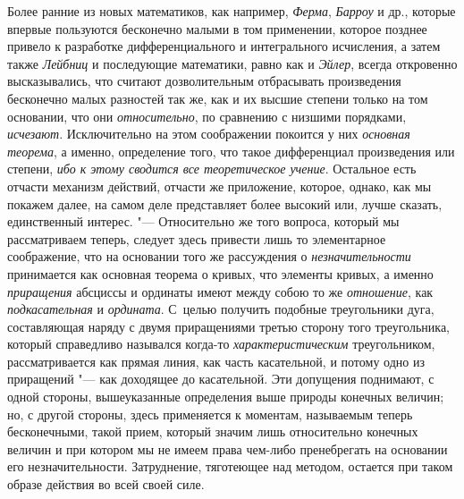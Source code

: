 Более ранние из новых математиков, как например, {\em Ферма}, {\em Барроу} и
др., которые впервые пользуются бесконечно малыми в том применении, которое
позднее привело к разработке дифференциального и интегрального исчисления, а
затем также {\em Лейбниц} и последующие математики, равно как и {\em Эйлер},
всегда откровенно высказывались, что считают дозволительным отбрасывать
произведения бесконечно малых разностей так же, как и их высшие степени только
на том основании, что они {\em относительно}, по сравнению с низшими порядками,
{\em исчезают}. Исключительно на этом соображении покоится у них
{\em основная теорема}, а именно, определение того, что такое дифференциал
произведения или степени, {\em ибо к этому сводится все теоретическое
учение}. Остальное есть отчасти механизм действий, отчасти же приложение,
которое, однако, как мы покажем далее, на самом деле представляет более высокий
или, лучше сказать, единственный интерес. "--- Относительно же того вопроса,
который мы рассматриваем теперь, следует здесь привести лишь то элементарное
соображение, что на основании того же рассуждения о {\em незначительности}
принимается как основная теорема о кривых, что элементы кривых, а именно
{\em приращения} абсциссы и ординаты имеют между собою то же {\em отношение},
как {\em подкасательная} и {\em ордината}. С~целью получить подобные
треугольники дуга, составляющая наряду с двумя приращениями третью сторону того
треугольника, который справедливо назывался когда-то {\em характеристическим}
треугольником, рассматривается как прямая линия, как часть касательной, и
потому одно из приращений "--- как доходящее до касательной. Эти допущения
поднимают, с одной стороны, вышеуказанные определения выше природы конечных
величин; но, с другой стороны, здесь применяется к моментам, называемым теперь
бесконечными, такой прием, который значим лишь относительно конечных величин и
при котором мы не имеем права чем-либо пренебрегать на основании его
незначительности. Затруднение, тяготеющее над методом, остается при таком
образе действия во всей своей силе.

